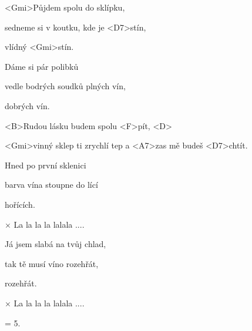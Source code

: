 

\zs
<Gmi>Půjdem spolu do sklípku,

sedneme si v koutku, kde je <D7>stín,

vlídný <Gmi>stín.
\ks

\zs
Dáme si pár polibků

vedle bodrých soudků plných vín,

dobrých vín.
\ks

\zr
<B>Rudou lásku budem spolu <F>pít, <D>

<Gmi>vinný sklep ti zrychlí tep a <A7>zas mě budeš <D7>chtít.
\kr

\zs
Hned po první sklenici

barva vína stoupne do lící

hořících.
\ks

× La la la la lalala ....
\ks

\zr
\kr

\zs
Já jsem slabá na tvůj chlad,

tak tě musí víno rozehřát,

rozehřát.
\ks

× La la la la lalala ....
\ks

\zr
\kr

\zs
= 5.
\ks

\kp
